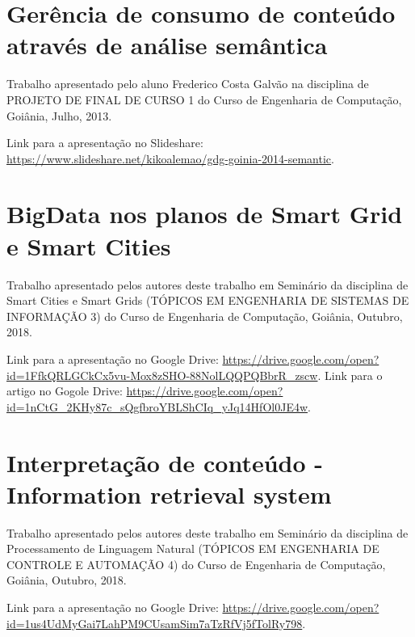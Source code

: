\documentclass[
	12pt,				%
	openright,			%
	twoside,			%
	a4paper,			%
	english,			%
	french,				%
	spanish,			%
	brazil				%
	]{abntex2}
\begin{document}
\begin{apendicesenv}

\partapendices



\chapter{Gerência de consumo de conteúdo através de análise semântica}

Trabalho apresentado pelo aluno Frederico Costa Galvão na disciplina de PROJETO DE FINAL DE CURSO 1 do Curso de Engenharia de Computação, Goiânia, Julho, 2013.

Link para a apresentação no Slideshare: \url{https://www.slideshare.net/kikoalemao/gdg-goinia-2014-semantic}.

\chapter{BigData nos planos de Smart Grid e Smart Cities}

Trabalho apresentado pelos autores deste trabalho em Seminário da disciplina de Smart Cities e Smart Grids (TÓPICOS EM ENGENHARIA DE SISTEMAS DE INFORMAÇÃO 3) do Curso de Engenharia de Computação, Goiânia, Outubro, 2018.

Link para a apresentação no Google Drive: \url{https://drive.google.com/open?id=1FfkQRLGCkCx5vu-Mox8zSHO-88NolLQQPQBbrR_zscw}.
Link para o artigo no Gogole Drive: \url{https://drive.google.com/open?id=1nCtG_2KHy87c_sQgfbroYBLShCIq_yJq14HfOl0JE4w}.

\chapter{Interpretação de conteúdo - Information retrieval system}

Trabalho apresentado pelos autores deste trabalho em Seminário da disciplina de Processamento de Linguagem Natural (TÓPICOS EM ENGENHARIA DE CONTROLE E AUTOMAÇÃO 4) do Curso de Engenharia de Computação, Goiânia, Outubro, 2018.

Link para a apresentação no Google Drive: \url{https://drive.google.com/open?id=1us4UdMyGai7LahPM9CUsamSim7aTzRfVj5fTolRy798}.


\end{apendicesenv}


\printindex
\end{document}
